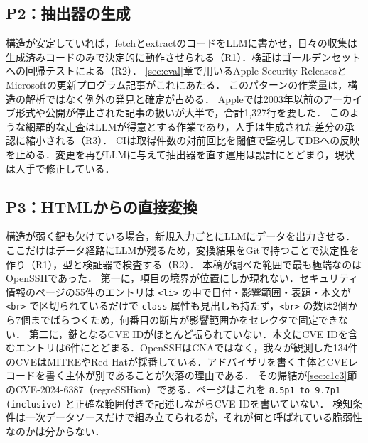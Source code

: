 \subsection{P2：抽出器の生成}
\label{sec:p2}

構造が安定していれば，fetchとextractのコードをLLMに書かせ，日々の収集は生成済みコードのみで決定的に動作させられる（R1）．検証はゴールデンセットへの回帰テストによる（R2）．
\ref{sec:eval}章で用いるApple Security Releases\cite{vdu-pr914}とMicrosoftの更新プログラム記事\cite{vdu-pr919}がこれにあたる．
このパターンの作業量は，構造の解析ではなく例外の発見と確定が占める．
Appleでは2003年以前のアーカイブ形式や公開が停止された記事の扱いが大半で，合計1,327行を要した．
このような網羅的な走査はLLMが得意とする作業であり，人手は生成された差分の承認に縮小される（R3）．
CIは取得件数の対前回比を閾値で監視してDBへの反映を止める．変更を再びLLMに与えて抽出器を直す運用は設計にとどまり，現状は人手で修正している．

\subsection{P3：HTMLからの直接変換}
\label{sec:p3}

構造が弱く鍵も欠けている場合，新規入力ごとにLLMにデータを出力させる．ここだけはデータ経路にLLMが残るため，変換結果をGitで持つことで決定性を作り（R1），型と検証器で検査する（R2）．
本稿が調べた範囲で最も極端なのはOpenSSHであった．
第一に，項目の境界が位置にしか現れない．セキュリティ情報のページ\cite{openssh-sec}の55件のエントリは \texttt{<li>} の中で日付・影響範囲・表題・本文が \texttt{<br>} で区切られているだけで \texttt{class} 属性も見出しも持たず，\texttt{<br>} の数は2個から7個までばらつくため，何番目の断片が影響範囲かをセレクタで固定できない．
第二に，鍵となるCVE IDがほとんど振られていない．本文にCVE IDを含むエントリは6件にとどまる．OpenSSHはCNAではなく，我々が観測した134件のCVEはMITREやRed Hatが採番している．アドバイザリを書く主体とCVEレコードを書く主体が別であることが欠落の理由である．
その帰結が\ref{sec:c1c3}節のCVE-2024-6387（regreSSHion）である．ページはこれを \texttt{8.5p1 to 9.7p1 (inclusive)} と正確な範囲付きで記述しながらCVE IDを書いていない．
検知条件は一次データソースだけで組み立てられるが，それが何と呼ばれている脆弱性なのかは分からない．

